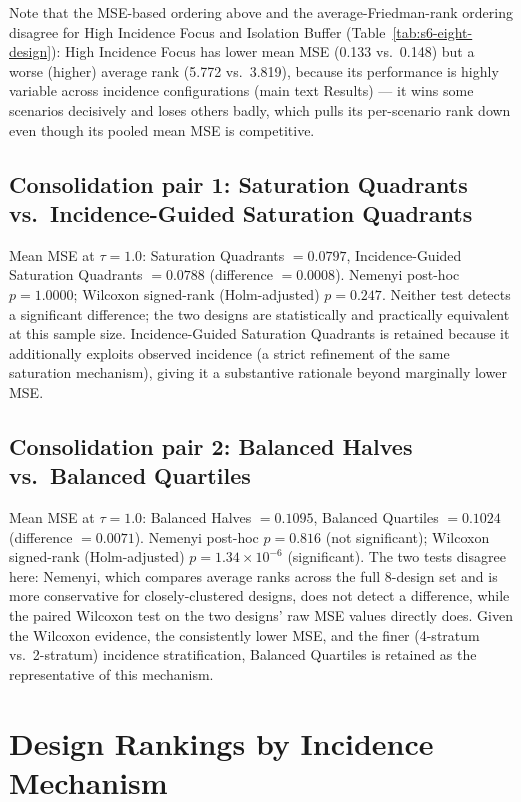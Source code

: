 \documentclass[11pt]{article}
\begin{document}
Note that the MSE-based ordering above and the average-Friedman-rank ordering
disagree for High Incidence Focus and Isolation Buffer (Table~\ref{tab:s6-eight-design}):
High Incidence Focus has lower mean MSE (0.133 vs.\ 0.148) but a worse (higher)
average rank (5.772 vs.\ 3.819), because its performance is highly variable
across incidence configurations (main text Results) --- it wins some scenarios
decisively and loses others badly, which pulls its per-scenario rank down even
though its pooled mean MSE is competitive.

\subsection*{Consolidation pair 1: Saturation Quadrants vs.\ Incidence-Guided Saturation Quadrants}

Mean MSE at $\tau=1.0$: Saturation Quadrants $=0.0797$, Incidence-Guided
Saturation Quadrants $=0.0788$ (difference $=0.0008$). Nemenyi post-hoc
$p=1.0000$; Wilcoxon signed-rank (Holm-adjusted) $p=0.247$. Neither test
detects a significant difference; the two designs are statistically and
practically equivalent at this sample size. Incidence-Guided Saturation
Quadrants is retained because it additionally exploits observed incidence
(a strict refinement of the same saturation mechanism), giving it a
substantive rationale beyond marginally lower MSE.

\subsection*{Consolidation pair 2: Balanced Halves vs.\ Balanced Quartiles}

Mean MSE at $\tau=1.0$: Balanced Halves $=0.1095$, Balanced Quartiles
$=0.1024$ (difference $=0.0071$). Nemenyi post-hoc $p=0.816$ (not significant);
Wilcoxon signed-rank (Holm-adjusted) $p=1.34\times10^{-6}$ (significant). The
two tests disagree here: Nemenyi, which compares average ranks across the full
8-design set and is more conservative for closely-clustered designs, does not
detect a difference, while the paired Wilcoxon test on the two designs' raw
MSE values directly does. Given the Wilcoxon evidence, the consistently lower
MSE, and the finer (4-stratum vs.\ 2-stratum) incidence stratification,
Balanced Quartiles is retained as the representative of this mechanism.

\section{Design Rankings by Incidence Mechanism}
\label{sec:s7}
\end{document}
